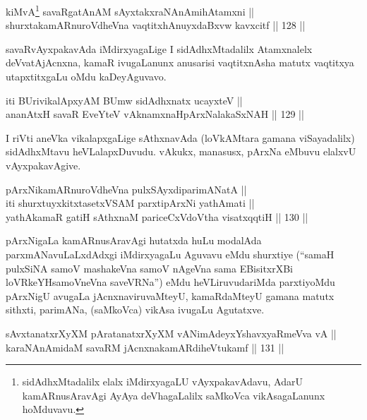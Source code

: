 

\begin{shl}
kiMvA\footnote{sidAdhxMtadalilx elalx iMdirxyagaLU vAyxpakavAdavu, AdarU kamARnusAravAgi AyAya deVhagaLalilx saMkoVca vikAsagaLanunx hoMduvavu.} savaRgatAnAM sAyxtakxraNAnAmihA\s \s tamxni || \\
shurxtakamARnuroVdheVna vaqtitxhAnuyxdaBxvw kavxcitf \hfill || 128 ||  
\end{shl}

\begin{artha}
savaRvAyxpakavAda iMdirxyagaLige I sidAdhxMtadalilx
Atamxnalelx deVvatAjAcnxna, kamaR ivugaLanunx anusarisi vaqtitxnAsha
matutx vaqtitxya utapxtitxgaLu oMdu kaDeyAguvavo.
\end{artha}


\begin{shl}
iti BUrivikalApxyAM BUmw sidAdhxnatx ucayxteV || \\
ananAtxH savaR EveYteV vAknamxnaHpArxNalakaSxNAH \hfill || 129 ||  
\end{shl}

\begin{artha}
I riVti aneVka vikalapxgaLige sAthxnavAda (loVkAMtara gamana
viSayadalilx) sidAdhxMtavu heVLalapxDuvudu. vAkukx, manasusx, pArxNa
eMbuvu elalxvU vAyxpakavAgive.
\end{artha}

\begin{shl}
pArxNikamARnuroVdheVna pulxSAyxdiparimANatA || \\
iti shurxtuyxkitxtasetxVSAM parxtipArxNi yathAmati || \\
yathAkamaR gatiH sAthxnaM pariceCxVdoV\s tha visatxqqtiH \hfill || 130 ||  
\end{shl}

\begin{artha}
pArxNigaLa kamARnusAravAgi hutatxda huLu modalAda parxmANavuLaLxdAdxgi
iMdirxyagaLu Aguvavu eMdu shurxtiye (``samaH pulxSiNA samoV mashakeVna samoV nAgeVna sama EBisitxrXBi loVRkeYH\break samoV\s neVna saveVRNa'') eMdu heVLiruvudariMda parxtiyoMdu pArxNigU avugaLa jAcnxnaviruvaMteyU, kamaRdaMteyU gamana
matutx sithxti, parimANa, (saMkoVca) vikAsa ivugaLu Agutatxve.
\end{artha}

\begin{shl}
sAvxtanatxrXyXM pAratanatxrXyXM vA\s NimAdeyxYshavxyaRmeVva vA || \\
karaNAnAmidaM savaRM jAcnxnakamARdiheVtukamf \hfill || 131 ||  
\end{shl}

